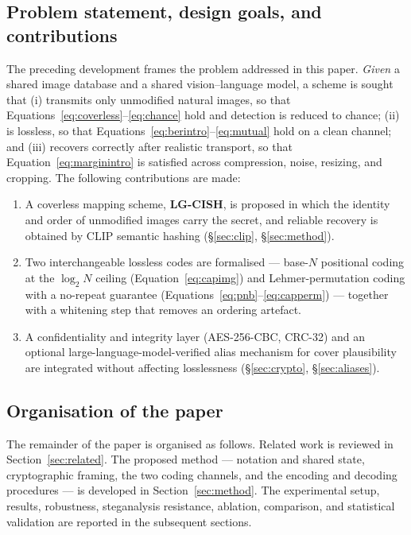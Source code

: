 \documentclass[11pt]{article}
\theoremstyle{definition}
\newcommand{\Eqn}[1]{Equation~\eqref{#1}}
\newcommand{\Eqns}[2]{Equations~\eqref{#1}--\eqref{#2}}
\begin{document}
\subsection{Problem statement, design goals, and contributions}\label{sec:contrib}
The preceding development frames the problem addressed in this paper. \emph{Given}
a shared image database and a shared vision--language model, a scheme is sought
that (i) transmits only unmodified natural images, so that
\Eqns{eq:coverless}{eq:chance} hold and detection is reduced to chance;
(ii) is lossless, so that \Eqns{eq:berintro}{eq:mutual} hold on a clean
channel; and (iii) recovers correctly after realistic transport, so that
\Eqn{eq:marginintro} is satisfied across compression, noise, resizing, and
cropping. The following contributions are made:
\begin{enumerate}
  \item A coverless mapping scheme, \textbf{LG-CISH}, is proposed in which the
        identity and order of unmodified images carry the secret, and reliable
        recovery is obtained by CLIP semantic hashing (\S\ref{sec:clip},
        \S\ref{sec:method}).
  \item Two interchangeable lossless codes are formalised --- base-$N$ positional
        coding at the $\log_2 N$ ceiling (\Eqn{eq:capimg}) and Lehmer-permutation
        coding with a no-repeat guarantee (\Eqns{eq:pnb}{eq:capperm}) ---
        together with a whitening step that removes an ordering artefact.
  \item A confidentiality and integrity layer (AES-256-CBC, CRC-32) and an optional
        large-language-model-verified alias mechanism for cover plausibility are
        integrated without affecting losslessness (\S\ref{sec:crypto},
        \S\ref{sec:aliases}).
\end{enumerate}

\subsection{Organisation of the paper}\label{sec:org}
The remainder of the paper is organised as follows. Related work is reviewed in
Section~\ref{sec:related}. The proposed method --- notation and shared state,
cryptographic framing, the two coding channels, and the encoding and decoding
procedures --- is developed in Section~\ref{sec:method}. The experimental setup,
results, robustness, steganalysis resistance, ablation, comparison, and
statistical validation are reported in the subsequent sections.
\end{document}
